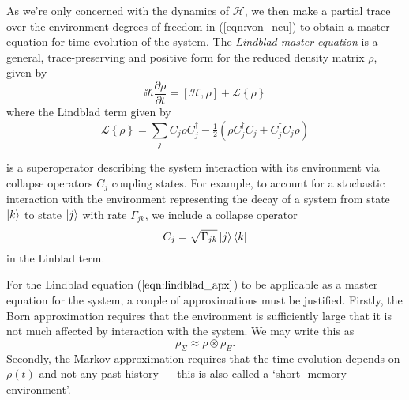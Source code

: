     As we're only concerned with the dynamics of $\mathcal{H}$, we then make a
    partial trace over the environment degrees of freedom in (\ref{eqn:von_neu})
    to obtain a master equation for time evolution of the system. The
    \textit{Lindblad master equation} is a general, trace-preserving and
    positive form for the reduced density matrix $\rho$, given by
    \begin{equation}
      \ii \hbar \frac{\partial \rho}{\partial t} = [\mathcal{H}, \rho] + 
        \mathcal{L}\left\{ \rho \right\}
      \label{eqn:lindblad_apx}
    \end{equation}
    where the Lindblad term given by
    \begin{equation}
      \mathcal{L}\left\{ \rho \right\} = \sum_j{C_j \rho C_j^\dagger - 
      \tfrac{1}{2}\left(\rho C_j^\dagger C_j + C_j^\dagger C_j \rho \right)}
      \label{eqn:lindblad_op}
    \end{equation}

    is a superoperator describing the system interaction with its environment
    via collapse operators $C_j$ coupling states. For example, to account for a
    stochastic interaction with the environment representing the decay of a
    system from state $\Ket{k}$ to state $\Ket{j}$ with rate $\Gamma_{jk}$, we
    include a collapse operator
    $$
    C_j = \sqrt{\Gamma_{jk}}\Ket{j}\Bra{k}
    $$
    in the Linblad term.

    For the Lindblad equation ($\ref{eqn:lindblad_apx}$) to be applicable as a
    master equation for the system, a couple of approximations must be
    justified. Firstly, the Born approximation requires that the environment is
    sufficiently large that it is not much affected by interaction with the
    system. We may write this as 
    \begin{equation}
      \rho_\Sigma \approx \rho \otimes \rho_E.
    \end{equation}
    Secondly, the Markov approximation requires that the time evolution depends
    on $\rho(t)$ and not any past history --- this is also called a `short-
    memory environment'.

